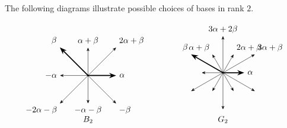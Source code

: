 \begin{example}
    The following diagrams illustrate possible choices of bases in rank \(2\).

    \[
        \begin{tikzpicture}[scale=0.85,>=Stealth]
            \coordinate (O) at (0,0);

            \draw[->, very thick] (O) -- (1.4,0)
            node[right] {\(\alpha\)};
            \draw[->, very thick] (O) -- (-1.4,1.4)
            node[above left] {\(\beta\)};

            \draw[->] (O) -- (0,1.4)
            node[above] {\(\alpha+\beta\)};
            \draw[->] (O) -- (1.4,1.4)
            node[above right] {\(2\alpha+\beta\)};

            \draw[->] (O) -- (-1.4,0)
            node[left] {\(-\alpha\)};
            \draw[->] (O) -- (1.4,-1.4)
            node[below right] {\(-\beta\)};
            \draw[->] (O) -- (0,-1.4)
            node[below] {\(-\alpha-\beta\)};
            \draw[->] (O) -- (-1.4,-1.4)
            node[below left] {\(-2\alpha-\beta\)};

            \fill (O) circle (1.2pt);
            \node at (0,-2.2) {\(B_2\)};
        \end{tikzpicture}
        \qquad\qquad
        \begin{tikzpicture}[scale=0.75,>=Stealth]
            \coordinate (O) at (0,0);

            \draw[->, very thick] (O) -- (1.2,0)
            node[right] {\(\alpha\)};
            \draw[->, very thick] (O) -- (-1.8,1.04)
            node[above left] {\(\beta\)};

            \draw[->] (O) -- (-0.6,1.04)
            node[above left] {\(\alpha+\beta\)};
            \draw[->] (O) -- (0.6,1.04)
            node[above right] {\(2\alpha+\beta\)};
            \draw[->] (O) -- (1.8,1.04)
            node[above right] {\(3\alpha+\beta\)};
            \draw[->] (O) -- (0,2.08)
            node[above] {\(3\alpha+2\beta\)};

            \draw[->] (O) -- (-1.2,0);
            \draw[->] (O) -- (1.8,-1.04);
            \draw[->] (O) -- (0.6,-1.04);
            \draw[->] (O) -- (-0.6,-1.04);
            \draw[->] (O) -- (-1.8,-1.04);
            \draw[->] (O) -- (0,-2.08);

            \fill (O) circle (1.2pt);
            \node at (0,-2.65) {\(G_2\)};
        \end{tikzpicture}
    \]
\end{example}

